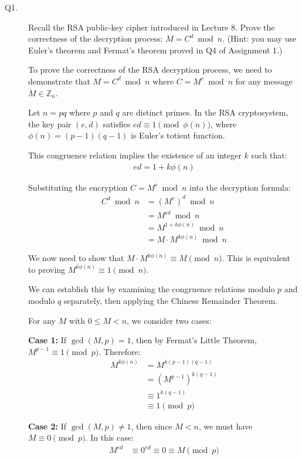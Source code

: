\documentclass[11pt,epsfig]{article}
\begin{document}
\begin{description}

\item[Q1.] Recall the RSA public-key cipher introduced in Lecture 8. Prove the correctness of the decryption process: $M=C^d \bmod{n}$.  (Hint: you may use Euler's theorem and Fermat's theorem proved in Q4 of Assignment 1.) \hfill {}

 To prove the correctness of the RSA decryption process, we need to demonstrate that $M = C^d \bmod{n}$ where $C = M^e \bmod{n}$ for any message $M \in \mathbb{Z}_n$.

Let $n = pq$ where $p$ and $q$ are distinct primes. In the RSA cryptosystem, the key pair $(e,d)$ satisfies $ed \equiv 1 \pmod{\phi(n)}$, where $\phi(n) = (p-1)(q-1)$ is Euler's totient function.

This congruence relation implies the existence of an integer $k$ such that:
\begin{align}
ed = 1 + k\phi(n)
\end{align}

Substituting the encryption $C = M^e \bmod{n}$ into the decryption formula:
\begin{align}
C^d \bmod{n} &= (M^e)^d \bmod{n}\\
&= M^{ed} \bmod{n}\\
&= M^{1 + k\phi(n)} \bmod{n}\\
&= M \cdot M^{k\phi(n)} \bmod{n}
\end{align}

We now need to show that $M \cdot M^{k\phi(n)} \equiv M \pmod{n}$. This is equivalent to proving $M^{k\phi(n)} \equiv 1 \pmod{n}$.

We can establish this by examining the congruence relations modulo $p$ and modulo $q$ separately, then applying the Chinese Remainder Theorem.

For any $M$ with $0 \leq M < n$, we consider two cases:

\textbf{Case 1:} If $\gcd(M,p) = 1$, then by Fermat's Little Theorem, $M^{p-1} \equiv 1 \pmod{p}$. Therefore:
\begin{align}
M^{k\phi(n)} &= M^{k(p-1)(q-1)}\\
&= (M^{p-1})^{k(q-1)}\\
&\equiv 1^{k(q-1)}\\
&\equiv 1 \pmod{p}
\end{align}

\textbf{Case 2:} If $\gcd(M,p) \neq 1$, then since $M < n$, we must have $M \equiv 0 \pmod{p}$. In this case:
\begin{align}
M^{ed} &\equiv 0^{ed} \equiv 0 \equiv M \pmod{p}
\end{align}


\end{description}
\end{document}
